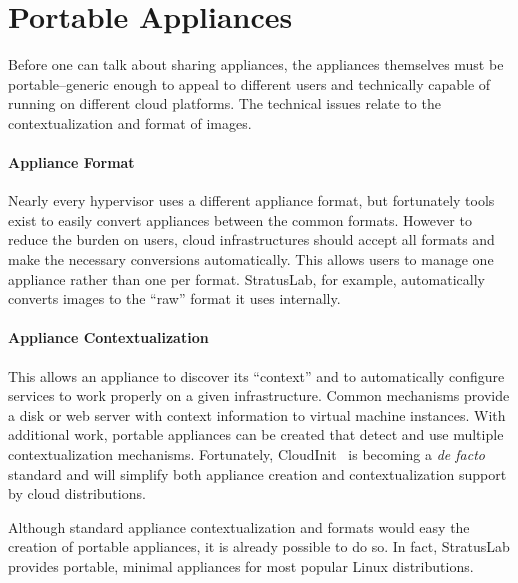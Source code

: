 \section{Portable Appliances}
\label{sec:portable-appliances}

Before one can talk about sharing appliances, the appliances
themselves must be portable--generic enough to appeal to different
users and technically capable of running on different cloud
platforms.  The technical issues relate to the contextualization and
format of images. 

\paragraph*{Appliance Format}
Nearly every hypervisor uses a different appliance format, but
fortunately tools exist to easily convert appliances between the
common formats.  However to reduce the burden on users, cloud
infrastructures should accept all formats and make the necessary
conversions automatically.  This allows users to manage one appliance
rather than one per format.  StratusLab, for example, automatically
converts images to the ``raw'' format it uses internally. 

\paragraph*{Appliance Contextualization} This allows an appliance to
discover its ``context'' and to automatically configure services to
work properly on a given infrastructure.  Common mechanisms provide a
disk or web server with context information to virtual machine
instances.  With additional work, portable appliances can be created
that detect and use multiple contextualization mechanisms.
Fortunately, CloudInit~\cite{cloudinit} is becoming a {\em de facto}
standard and will simplify both appliance creation and
contextualization support by cloud distributions.

Although standard appliance contextualization and formats would easy
the creation of portable appliances, it is already possible to do so.
In fact, StratusLab provides portable, minimal appliances for most
popular Linux distributions.
